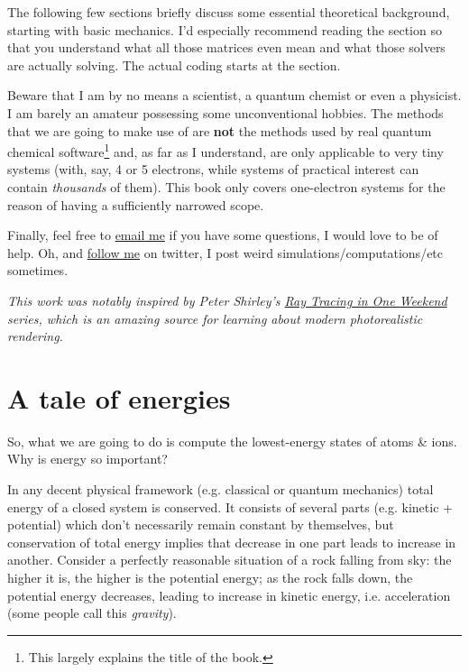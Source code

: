 \documentclass{article}
\begin{document}
The following few sections briefly discuss some essential theoretical background, starting with basic mechanics. I'd especially recommend reading the  section so that you understand what all those matrices even mean and what those solvers are actually solving. The actual coding starts at the  section.

Beware that I am by no means a scientist, a quantum chemist or even a physicist. I am barely an amateur possessing some unconventional hobbies. The methods that we are going to make use of are \textbf{not} the methods used by real quantum chemical software\footnote{This largely explains the title of the book.} and, as far as I understand, are only applicable to very tiny systems (with, say, 4 or 5 electrons, while systems of practical interest can contain \textit{thousands} of them). This book only covers one-electron systems for the reason of having a sufficiently narrowed scope.

Finally, feel free to \href{mailto:lisyarus@gmail.com}{email me} if you have some questions, I would love to be of help. Oh, and \href{https://twitter.com/lisyarus}{follow me} on twitter, I post weird simulations/computations/etc sometimes.

\bigbreak
\textit{This work was notably inspired by Peter Shirley's \href{https://raytracing.github.io}{Ray Tracing in One Weekend} series, which is an amazing source for learning about modern photorealistic rendering.}

\newpage

\section{A tale of energies}

So, what we are going to do is compute the lowest-energy states of atoms \& ions. Why is energy so important?

In any decent physical framework (e.g. classical or quantum mechanics) total energy of a closed system is conserved. It consists of several parts (e.g. kinetic + potential) which don't necessarily remain constant by themselves, but conservation of total energy implies that decrease in one part leads to increase in another. Consider a perfectly reasonable situation of a rock falling from sky: the higher it is, the higher is the potential energy; as the rock falls down, the potential energy decreases, leading to increase in kinetic energy, i.e. acceleration (some people call this \textit{gravity}).
\end{document}
